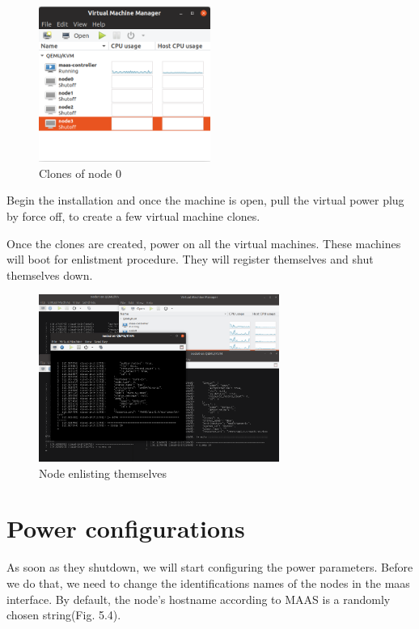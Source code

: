 \begin{figure}[!ht]
    \centering
    \includegraphics[width=0.5\textwidth]{images/5-2.png}
    \caption{Clones of node 0}
\end{figure}


Begin the installation and once the machine is open, pull the virtual power plug by force off, to create a few virtual machine clones.

Once the clones are created, power on all the virtual machines. These machines will boot for enlistment procedure. They will register themselves and shut themselves down.

\begin{figure}[!ht]
    \centering
    \includegraphics[width=0.7\textwidth]{images/5-3.png}
    \caption{Node enlisting themselves}
\end{figure}

\section{Power configurations}

As soon as they shutdown, we will start configuring the power parameters. Before we do that, we need to change the identifications names of the nodes in the maas interface. 
By default, the node's hostname according to MAAS is a randomly chosen string(Fig. 5.4).

